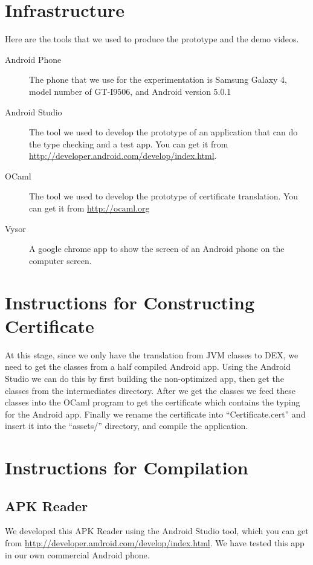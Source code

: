 \documentclass[a4]{article}
\begin{document}
\section{Infrastructure}
Here are the tools that we used to produce the prototype and the demo videos.
\begin{description}
  \item[Android Phone] The phone that we use for the experimentation is 
    Samsung Galaxy 4, model number of GT-I9506, and Android version 5.0.1
  \item[Android Studio] The tool we used to develop the prototype of an application
    that can do the type checking and a test app. You can get it from 
    \href{http://developer.android.com/develop/index.html}
    {http://developer.android.com/develop/index.html}.
  \item[OCaml] The tool we used to develop the prototype of certificate translation.
    You can get it from \href{http://ocaml.org}{http://ocaml.org}
  \item[Vysor] A google chrome app to show the screen of an Android phone on the 
    computer screen.
\end{description}

\section{Instructions for Constructing Certificate}
At this stage, since we only have the translation from JVM classes to DEX, we need to 
get the classes from a half compiled Android app. Using the Android Studio we can do
this by first building the non-optimized app, then get the classes from the 
intermediates directory. After we get the classes we feed these classes into the OCaml
program to get the certificate which contains the typing for the Android app. Finally
we rename the certificate into ``Certificate.cert'' and insert it into the ``assets/''
directory, and compile the application.

\section{Instructions for Compilation}
\subsection{APK Reader}
We developed this APK Reader using the Android Studio tool, which you can get from
\href{http://developer.android.com/develop/index.html}{http://developer.android.com/develop/index.html}. 
We have tested this app in our own commercial Android phone. 
\end{document}
